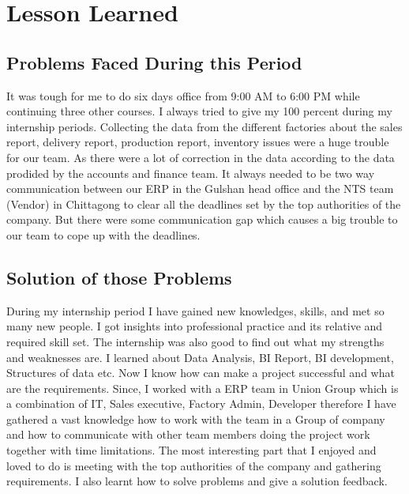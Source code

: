 \chapter{Lesson Learned}

\section{Problems Faced During this Period}

It was tough for me to do six days office from 9:00 AM to 6:00 PM while continuing three other courses. I always tried to give my 100 percent during my internship periods. Collecting the data from the different factories about the sales report, delivery report, production report, inventory issues were a huge trouble for our team. As there were a lot of correction in the data according to the data prodided by the accounts and finance team. It always needed to be two way communication between our ERP in the Gulshan head office and the NTS team (Vendor) in Chittagong to clear all the deadlines set by the top authorities of the company. But there were some communication gap which causes a big trouble to our team to cope up with the deadlines. 

\section{Solution of those Problems}

During my internship period I have gained new knowledges, skills, and met so many new people. I got insights into professional practice and its relative and required skill set. The internship was also good to find out what my strengths and weaknesses are. I learned about Data Analysis, BI Report, BI development, Structures of data etc. Now I know how can make a project successful and what are the requirements. Since, I worked with a ERP team in Union Group which is a combination of IT, Sales executive, Factory Admin, Developer therefore I have gathered a vast knowledge how to work with the team in a Group of company and how to communicate with other team members doing the project work together with time limitations. The most interesting part that I enjoyed and loved to do is meeting with the top authorities of the company and gathering requirements. I also learnt how to solve problems and give a solution feedback.
